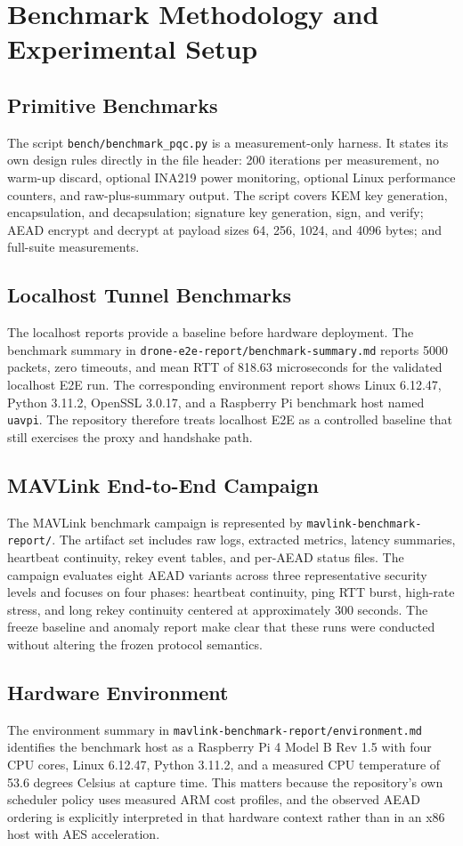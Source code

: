 \documentclass[conference]{IEEEtran}
\begin{document}
\section{Benchmark Methodology and Experimental Setup}
\subsection{Primitive Benchmarks}
The script \texttt{bench/benchmark\_pqc.py} is a measurement-only harness. It states its own design rules directly in the file header: 200 iterations per measurement, no warm-up discard, optional INA219 power monitoring, optional Linux performance counters, and raw-plus-summary output. The script covers KEM key generation, encapsulation, and decapsulation; signature key generation, sign, and verify; AEAD encrypt and decrypt at payload sizes 64, 256, 1024, and 4096 bytes; and full-suite measurements.

\subsection{Localhost Tunnel Benchmarks}
The localhost reports provide a baseline before hardware deployment. The benchmark summary in \texttt{drone-e2e-report/benchmark-summary.md} reports 5000 packets, zero timeouts, and mean RTT of 818.63 microseconds for the validated localhost E2E run. The corresponding environment report shows Linux 6.12.47, Python 3.11.2, OpenSSL 3.0.17, and a Raspberry Pi benchmark host named \texttt{uavpi}. The repository therefore treats localhost E2E as a controlled baseline that still exercises the proxy and handshake path.

\subsection{MAVLink End-to-End Campaign}
The MAVLink benchmark campaign is represented by \texttt{mavlink-benchmark-report/}. The artifact set includes raw logs, extracted metrics, latency summaries, heartbeat continuity, rekey event tables, and per-AEAD status files. The campaign evaluates eight AEAD variants across three representative security levels and focuses on four phases: heartbeat continuity, ping RTT burst, high-rate stress, and long rekey continuity centered at approximately 300 seconds. The freeze baseline and anomaly report make clear that these runs were conducted without altering the frozen protocol semantics.

\subsection{Hardware Environment}
The environment summary in \texttt{mavlink-benchmark-report/environment.md} identifies the benchmark host as a Raspberry Pi 4 Model B Rev 1.5 with four CPU cores, Linux 6.12.47, Python 3.11.2, and a measured CPU temperature of 53.6 degrees Celsius at capture time. This matters because the repository's own scheduler policy uses measured ARM cost profiles, and the observed AEAD ordering is explicitly interpreted in that hardware context rather than in an x86 host with AES acceleration.
\end{document}

